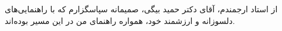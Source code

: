 



\begin{center}
\end{center}

از استاد ارجمندم، آقای دکتر حمید بیگی، صمیمانه سپاسگزارم که با راهنمایی‌های دلسوزانه و ارزشمند خود، همواره راهنمای من در این مسیر بوده‌اند.